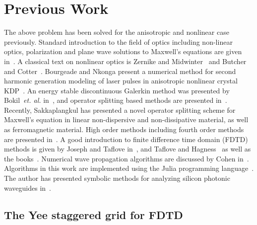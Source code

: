 \documentclass{article}[12pt]
\theoremstyle{plain}
\begin{document}
\section{Previous Work}
\label{sec:previous_work}
The above problem has been solved for the anisotropic and nonlinear case previously.
Standard introduction to the field of optics including non-linear optics,
polarization and plane wave solutions to Maxwell's equations are given in~\cite{boyd2012contemporary,agrawal2007nonlinear,fowles1975introduction}.
A classical text on nonlinear optics is Zernike and Midwinter~\cite{zernike2006applied} and
Butcher and Cotter~\cite{butcher1991elements}.
Bourgeade and Nkonga present a numerical method for second harmonic
generation modeling of laser pulses in anisotropic nonlinear crystal 
KDP~\cite{bourgeade_and_nkonga_siam_2005}. 
An energy stable discontinuous Galerkin method was presented by
Bokil~\emph{et. al.} in~\cite{BOKIL2017420}, and operator splitting based methods
are presented in~\cite{BOKIL2014160}.
Recently, Sakkaplangkul has presented a novel operator splitting
scheme for Maxwell's equation in linear non-dispersive and
non-dissipative material, as well as ferromagnetic material.
High order methods including fourth order methods are presented in~\cite{YEFET2001286, energy_conserved_siam_2010,
Chen2008,bokil2011analysis}.
A good introduction to finite difference time domain (FDTD) methods
is given by Joseph and Taflove in~\cite{joseph1997fdtd}, and Taflove and Hagness~\cite{taflove2005computational}
as well
as the books~\cite{yu2006parallel,rylander2012computational,leveque2007finite}. 
Numerical wave propagation algorithms are discussed by Cohen in~\cite{cohen2001higher,cohen2016finite}.
Algorithms in this work are
implemented using the Julia programming language~\cite{bezanson2017julia}.
The author has presented
symbolic methods for analyzing silicon photonic waveguides 
in~\cite{koranneTCAD_Photonics}.

\subsection{The Yee staggered grid for FDTD}
\label{subsec:yee}
\end{document}
